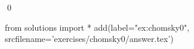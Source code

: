 
\begin{ex} 
  \label{ex:chomsky0}
  
  \qed
\end{ex} 
\begin{python0}
from solutions import *
add(label="ex:chomsky0",
    srcfilename='exercises/chomsky0/answer.tex') 
\end{python0}
